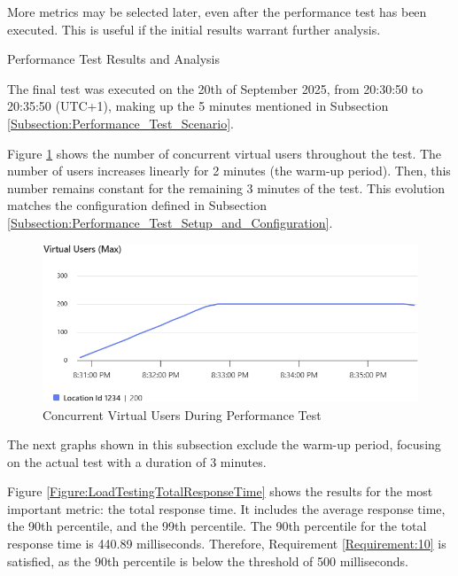 \documentclass[12pt, reqno]{amsbook}
\makeatletter
\def\subsection{\@startsection{subsection}{2}%
      \z@{.5\linespacing\@plus.7\linespacing}{.25\linespacing}%
      {\normalfont\bfseries\flushleft}}
\theoremstyle{definition}
\theoremstyle{definition}
\numberwithin{section}{chapter}
\numberwithin{table}{chapter}
\numberwithin{figure}{chapter}
\makeatother
\begin{document}
More metrics may be selected later, even after the performance test has been executed. This is useful if the initial results warrant further analysis.

\subsection{Performance Test Results and Analysis}
\label{Subsection:Performance_Test_Results_and_Analysis}

The final test was executed on the 20th of September 2025, from 20:30:50 to 20:35:50 (UTC+1), making up the 5 minutes mentioned in Subsection \ref{Subsection:Performance_Test_Scenario}.

Figure \ref{Figure:LoadTestingVirtualUsers} shows the number of concurrent virtual users throughout the test. The number of users increases linearly for 2 minutes (the warm-up period). Then, this number remains constant for the remaining 3 minutes of the test. This evolution matches the configuration defined in Subsection \ref{Subsection:Performance_Test_Setup_and_Configuration}.

\begin{figure}[H]
  \centering
  \includegraphics[width=0.98\linewidth]{images/LoadTestingVirtualUsers.png}
  \caption{\label{Figure:LoadTestingVirtualUsers}Concurrent Virtual Users During Performance Test}
\end{figure}

The next graphs shown in this subsection exclude the warm-up period, focusing on the actual test with a duration of 3 minutes.

Figure \ref{Figure:LoadTestingTotalResponseTime} shows the results for the most important metric: the total response time. It includes the average response time, the 90th percentile, and the 99th percentile. The 90th percentile for the total response time is 440.89 milliseconds. Therefore, Requirement \ref{Requirement:10} is satisfied, as the 90th percentile is below the threshold of 500 milliseconds.
\end{document}
